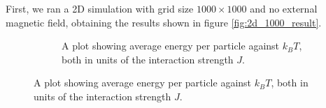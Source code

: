\documentclass[11pt]{article}
\begin{document}
	First, we ran a 2D simulation with grid size $1000 \times 1000$ and no external magnetic field, obtaining the results shown in figure \ref{fig:2d_1000_result}.
	\begin{figure}[H]
		\begin{subfigure}{\textwidth}
			\begin{center}
			\end{center}
			\caption{A plot showing average energy per particle against $k_BT$, both in units of the interaction strength $J$.}
		\end{subfigure}
	\end{figure}
\end{document}
